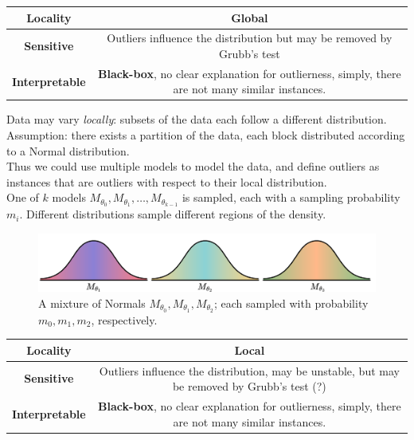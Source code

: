 \begin{table}
   \begin{tabular}{|c|c|}
      \textbf{Locality} & \textbf{Global} \\
      \hline
      \textbf{Sensitive} & Outliers influence the distribution but may be removed by Grubb's test \\
      \hline
      \textbf{Interpretable} & \textbf{Black-box}, no clear explanation for outlierness, simply, there are not many similar instances.\\
   \end{tabular}
\end{table}


Data may vary \textit{locally}: subsets of the data each follow a different distribution.\\
Assumption: there exists a partition of the data, each block distributed according to a Normal distribution.\\
Thus we could use multiple models to model the data, and define outliers as instances that are outliers with respect to their local distribution.\\

One of $k$ models $M_{\theta_{0}}, M_{\theta_{1}}, \ldots, M_{\theta_{k-1}}$ is sampled, each with a sampling probability $m_i$. Different distributions sample different regions of the density.

\begin{figure}[htbp]
   \centering
   \includegraphics{images/06/mixture.png}
   \caption{A mixture of Normals $M_{\theta_0}, M_{\theta_1}, M_{\theta_2}$; each sampled with probability $m_0, m_1, m_2$, respectively.}
   \label{fig:06/mixture}
\end{figure}

\begin{table}
   \begin{tabular}{|c|c|}
      \textbf{Locality} & \textbf{Local} \\
      \hline
      \textbf{Sensitive} & Outliers influence the distribution, may be unstable, but may be removed by Grubb's test (?) \\
      \hline
      \textbf{Interpretable} & \textbf{Black-box}, no clear explanation for outlierness, simply, there are not many similar instances.\\
   \end{tabular}
\end{table}


